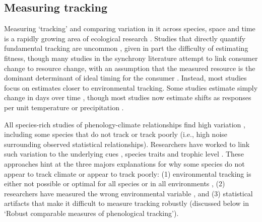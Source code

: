 \documentclass[11pt,letterpaper]{article}
\begin{document}
\subsection{Measuring tracking}
Measuring `tracking' and comparing variation in it across species, space and time is a rapidly growing area of ecological research \citep[e.g.,][]{Cook:2012pnas,fu2015,thackeray2016,cohen2018}. Studies that directly quantify fundamental tracking are uncommon \citep[but see][]{visser2006,charm2008}, given in part the difficulty of estimating fitness, though many studies in the synchrony literature attempt to link consumer change to resource change, with an assumption that the measured resource is the dominant determinant of ideal timing for the consumer \citep[though this may rarely be true, see][]{Singer:2010eb,Johansson2012,reed2013}. Instead, most studies focus on estimates closer to environmental tracking. Some studies estimate simply change in days over time \citep[e.g.,][]{Parmesan:2007tv,kharouba2018}, though most studies now estimate shifts as responses per unit temperature \citep[for example, multiple meta-analyses show plants' spring phenology shifts with spring or annual temperatures 4-6 days/$\degree$C on average across species,][]{Richardson:2006qh,Wolkovich:2012n,thackeray2016} or precipitation \citep{inouye2002,Craine:2012kl}. %

All species-rich studies of phenology-climate relationships find high variation \citep{Cook:2012pnas,thackeray2016}, including some species that do not track or track poorly (i.e., high noise surrounding observed statistical relationships). Researchers have worked to link such variation to the underlying cues \citep[e.g.,][]{Cook:2012pnas}, species traits \citep[e.g.,][]{cohen2018} and trophic level \citep[e.g.,][]{thackeray2016}. These approaches hint at the three majors explanations for why some species do not appear to track climate or appear to track poorly: (1) environmental tracking is either not possible or optimal for all species or in all environments \citep[discussed below in `Tracking in single-species environments' and see][]{simons2011}, (2) researchers have measured the wrong environmental variable \citep[i.e., a variable species do not track,][]{chmura2019}, and (3) statistical artifacts that make it difficult to measure tracking robustly (discussed below in `Robust comparable measures of phenological tracking'). 
\end{document}
